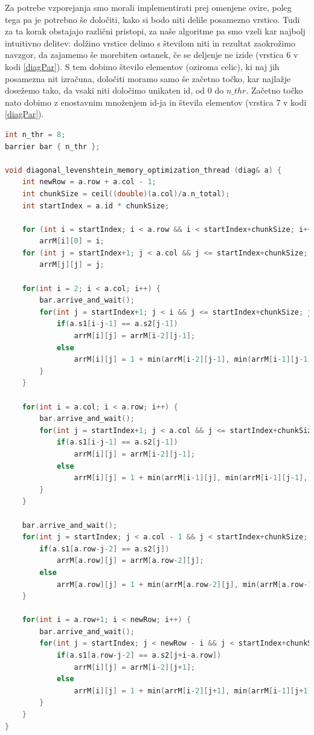 \documentclass[a4paper,12pt,openright]{book}
\begin{document}
Za potrebe vzporejanja smo morali implementirati prej omenjene ovire, poleg tega pa je potrebno še določiti, kako si bodo niti delile posamezno vrstico. Tudi za ta korak obstajajo različni pristopi, za naše algoritme pa smo vzeli kar najbolj intuitivno delitev: dolžino vrstice delimo s številom niti in rezultat zaokrožimo navzgor, da zajamemo še morebiten ostanek, če se deljenje ne izide (vrstica 6 v kodi \ref{diagPar}). S tem dobimo število elementov (oziroma celic), ki naj jih posamezna nit izračuna, določiti moramo samo še začetno točko, kar najlažje dosežemo tako, da vsaki niti določimo unikaten id, od 0 do $n\_thr$. Začetno točko nato dobimo z enostavnim množenjem id-ja in števila elementov (vrstica 7 v kodi \ref{diagPar}). 

\bigskip
\bigskip

\begin{lstlisting}[language=C++, caption={Vzporedni diagonalni algoritem za računanje Levenshteinove razdalje}, captionpos=b, label=diagPar]
int n_thr = 8;
barrier bar { n_thr };

void diagonal_levenshtein_memory_optimization_thread (diag& a) {
    int newRow = a.row + a.col - 1;
    int chunkSize = ceil((double)(a.col)/a.n_total);
    int startIndex = a.id * chunkSize;

    for (int i = startIndex; i < a.row && i < startIndex+chunkSize; i++)
        arrM[i][0] = i;
    for (int j = startIndex+1; j < a.col && j <= startIndex+chunkSize; j++)
        arrM[j][j] = j;

    for(int i = 2; i < a.col; i++) {
        bar.arrive_and_wait();
        for(int j = startIndex+1; j < i && j <= startIndex+chunkSize; j++) {
            if(a.s1[i-j-1] == a.s2[j-1])
                arrM[i][j] = arrM[i-2][j-1];
            else
                arrM[i][j] = 1 + min(arrM[i-2][j-1], min(arrM[i-1][j-1], arrM[i-1][j]));
        }
    }

    for(int i = a.col; i < a.row; i++) {
        bar.arrive_and_wait();
        for(int j = startIndex+1; j < a.col && j <= startIndex+chunkSize; j++) {
            if(a.s1[i-j-1] == a.s2[j-1])
                arrM[i][j] = arrM[i-2][j-1];
            else
                arrM[i][j] = 1 + min(arrM[i-1][j], min(arrM[i-1][j-1], arrM[i-2][j-1]));
        }
    }

    bar.arrive_and_wait();
    for(int j = startIndex; j < a.col - 1 && j < startIndex+chunkSize; j++) {
        if(a.s1[a.row-j-2] == a.s2[j])
            arrM[a.row][j] = arrM[a.row-2][j];
        else
            arrM[a.row][j] = 1 + min(arrM[a.row-2][j], min(arrM[a.row-1][j+1], arrM[a.row-1][j]));
    }
    
    for(int i = a.row+1; i < newRow; i++) {
        bar.arrive_and_wait();
        for(int j = startIndex; j < newRow - i && j < startIndex+chunkSize; j++) {
            if(a.s1[a.row-j-2] == a.s2[j+i-a.row])
                arrM[i][j] = arrM[i-2][j+1];
            else
                arrM[i][j] = 1 + min(arrM[i-2][j+1], min(arrM[i-1][j+1], arrM[i-1][j]));
        }
    }
}
        \end{lstlisting}
\end{document}
